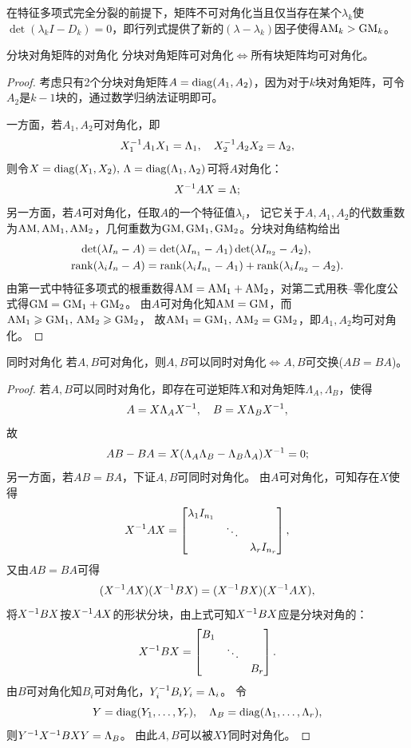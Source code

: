 \begin{corollary}
	在特征多项式完全分裂的前提下，矩阵不可对角化当且仅当存在某个$\lambda_k$使$\det(\lambda_kI - D_k) = 0$，即行列式提供了新的$(\lambda - \lambda_k)$因子使得$\mathrm{AM}_k > \mathrm{GM}_k$。
\end{corollary}

\begin{theorem}
	{分块对角矩阵的对角化}{}
	分块对角矩阵可对角化$\iff$所有块矩阵均可对角化。
\end{theorem}

\begin{proof}
	考虑只有2个分块对角矩阵$A = \operatorname{diag}(A_1,A_2)$，因为对于$k$块对角矩阵，可令$A_2$是$k - 1$块的，通过数学归纳法证明即可。

	一方面，若$A_1,A_2$可对角化，即
	\[
		X_1^{-1} A_1X_1 = \Lambda_1,\quad X_2^{-1} A_2X_2 = \Lambda_2,
	\]
	则令$X = \operatorname{diag}(X_1,X_2),\,\Lambda = \operatorname{diag}(\Lambda_1,\Lambda_2)$可将$A$对角化：
	\[
		X^{-1} AX = \Lambda;
	\]
	另一方面，若$A$可对角化，任取$A$的一个特征值$\lambda_i$，
	记它关于$A,A_1,A_2$的代数重数为$\mathrm{AM},\mathrm{AM}_1,\mathrm{AM}_2$，几何重数为$\mathrm{GM},\mathrm{GM}_1,\mathrm{GM}_2$。分块对角结构给出
	\begin{align*}
		\det(\lambda I_n - A) &= \det(\lambda I_{n_1} - A_1)\det(\lambda I_{n_2} - A_2),\\
		\operatorname{rank}(\lambda_iI_n - A) &= \operatorname{rank}(\lambda_iI_{n_1} - A_1) + \operatorname{rank}(\lambda_iI_{n_2} - A_2).
	\end{align*}
	由第一式中特征多项式的根重数得$\mathrm{AM} = \mathrm{AM}_1 + \mathrm{AM}_2$，对第二式用秩--零化度公式得$\mathrm{GM} = \mathrm{GM}_1 + \mathrm{GM}_2$。
	由$A$可对角化知$\mathrm{AM} = \mathrm{GM}$，而$\mathrm{AM}_1 \geqslant \mathrm{GM}_1,\,\mathrm{AM}_2 \geqslant \mathrm{GM}_2$，
	故$\mathrm{AM}_1 = \mathrm{GM}_1,\,\mathrm{AM}_2 = \mathrm{GM}_2$，即$A_1,A_2$均可对角化。
\end{proof}

\begin{theorem}{同时对角化}{}
	若$A,B$可对角化，则$A,B$可以同时对角化$\iff A,B$可交换($AB = BA$)。
\end{theorem}

\begin{proof}
	若$A,B$可以同时对角化，即存在可逆矩阵$X$和对角矩阵$\Lambda_A,\Lambda_B$，使得
	\[
		A = X\Lambda_AX^{-1},\quad B = X\Lambda_BX^{-1},
	\]
	故
	\[
		AB - BA = X(\Lambda_A\Lambda_B - \Lambda_B\Lambda_A)X^{-1} = 0;
	\]
	另一方面，若$AB = BA$，下证$A,B$可同时对角化。
	由$A$可对角化，可知存在$X$使得
	\[
		X^{-1} AX = \begin{bmatrix}
			\lambda_1I_{n_1}\\ &\ddots\\ &&\lambda_rI_{n_r}
		\end{bmatrix},
	\]
	又由$AB = BA$可得
	\[
		(X^{-1} AX)(X^{-1} BX) = (X^{-1} BX)(X^{-1} AX),
	\]
	将$X^{-1} BX$按$X^{-1} AX$的形状分块，由上式可知$X^{-1} BX$应是分块对角的：
	\[
		X^{-1} BX = \begin{bmatrix}
			B_1\\ &\ddots\\ &&B_r
		\end{bmatrix}.
	\]
	由$B$可对角化知$B_i$可对角化，$Y_i^{-1} B_iY_i = \Lambda_i$。
	令
	\[
		Y = \operatorname{diag}(Y_1,\ldots,Y_r),
		\quad
		\Lambda_B = \operatorname{diag}(\Lambda_1,\ldots,\Lambda_r),
	\]
	则$Y^{-1} X^{-1} BXY = \Lambda_B$。
	由此$A,B$可以被$XY$同时对角化。
\end{proof}

